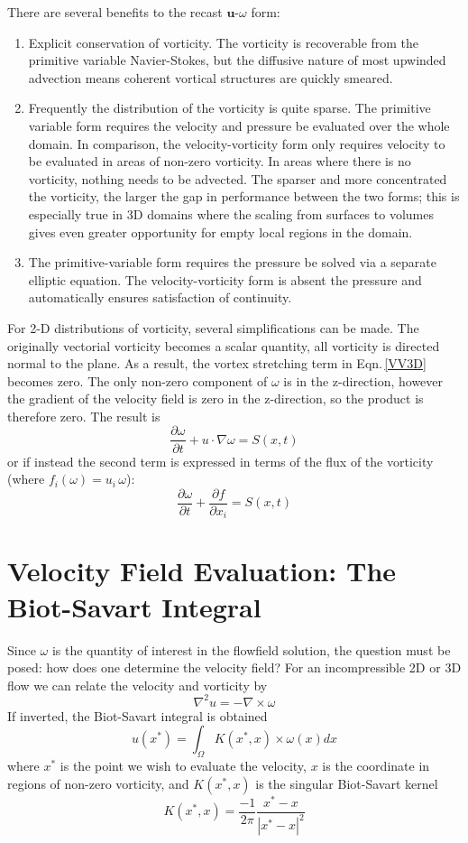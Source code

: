 \documentclass[letterpaper,12pt]{report}
\newcommand{\be}{\begin{equation}}
\newcommand{\ben}[1]{\begin{equation}\label{#1}}
\newcommand{\ee}{\end{equation}}
\begin{document}
There are several benefits to the recast $\mathbf{u}$-$\omega$ form:
\begin{enumerate}
\item Explicit conservation of vorticity. The vorticity is recoverable from the primitive variable Navier-Stokes, but the diffusive nature of most upwinded advection means coherent vortical structures are quickly smeared.
\item Frequently the distribution of the vorticity is quite sparse. The primitive variable form requires the velocity and pressure be evaluated over the whole domain. In comparison, the velocity-vorticity form only requires velocity to be evaluated in areas of non-zero vorticity. In areas where there is no vorticity, nothing needs to be advected. The sparser and more concentrated the vorticity, the larger the gap in performance between the two forms; this is especially true in 3D domains where the scaling from surfaces to volumes gives even greater opportunity for empty local regions in the domain. 
\item The primitive-variable form requires the pressure be  solved via a separate elliptic equation. The velocity-vorticity form is absent the pressure and automatically ensures satisfaction of continuity.
\end{enumerate}

For 2-D distributions of vorticity, several simplifications can be made. The originally vectorial vorticity becomes a scalar quantity, all vorticity is directed normal to the plane. As a result, the vortex stretching term in  Eqn.\,\eqref{VV3D} becomes zero. The only non-zero component of $\omega$ is in the z-direction, however the gradient of the velocity field is zero in the z-direction, so the product is therefore zero. The result is
\ben{VV2D} \frac{\partial \omega}{\partial t} + u \cdot \nabla \omega = S(x,t)\ee
or if instead the second term is expressed in terms of the flux of the vorticity (where $f_i(\omega)=u_i\,\omega$):
\ben{VV2DB} \frac{\partial \omega}{\partial t} + \frac{\partial f}{\partial x_i}= S(x,t)\ee

\section{Velocity Field Evaluation: The Biot-Savart Integral}
Since $\omega$ is the quantity of interest in the flowfield solution, the question must be posed: how does one determine the velocity field? For an incompressible 2D or 3D flow we can relate the velocity and vorticity by
\be \nabla^2 u = -\nabla \times \omega \ee
If inverted, the Biot-Savart integral is obtained
\ben{BS} u(x^*) = \int_\Omega K(x^*,x) \times \omega(x) dx \ee
where $x^*$ is the point we wish to evaluate the velocity, $x$ is the coordinate in regions of non-zero vorticity, and $K(x^*,x)$ is the singular Biot-Savart kernel \cite{BealeMajda}
\ben{BSkern} K(x^*,x) = \frac{-1}{2 \pi} \frac{x^*-x}{|x^*-x|^2} \ee
\end{document}
